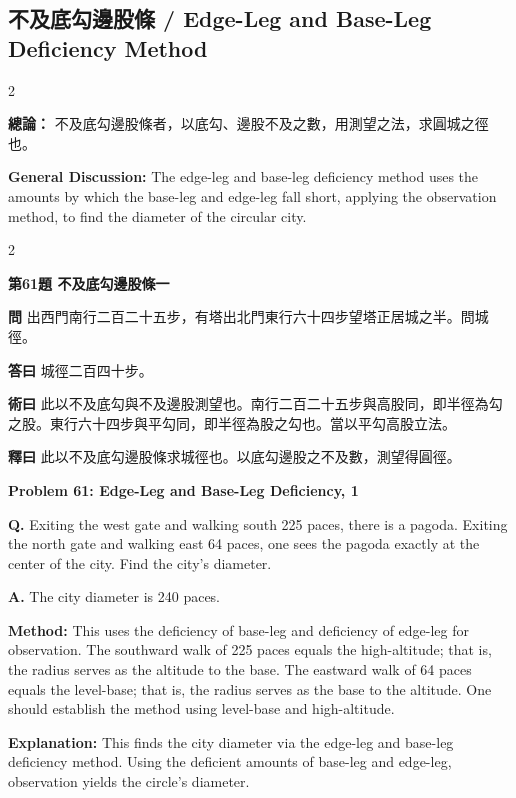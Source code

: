 \documentclass[11pt,a4paper]{article}
\newcommand{\wen}[1]{\noindent\textbf{問} #1\par\smallskip}
\newcommand{\da}[1]{\noindent\textbf{答曰} #1\par\smallskip}
\newcommand{\shu}[1]{\noindent\textbf{術曰} #1\par\smallskip}
\newcommand{\shi}[1]{\noindent\textbf{釋曰} #1\par\smallskip}
\newcommand{\wenE}[1]{\noindent\textbf{Q.} #1\par\smallskip}
\newcommand{\daE}[1]{\noindent\textbf{A.} #1\par\smallskip}
\newcommand{\shuE}[1]{\noindent\textbf{Method:} #1\par\smallskip}
\newcommand{\shiE}[1]{\noindent\textbf{Explanation:} #1\par\smallskip}
\begin{document}
\clearpage

\subsection*{不及底勾邊股條 / Edge-Leg and Base-Leg Deficiency Method}

\begin{paracol}{2}

\noindent\textbf{總論：} 不及底勾邊股條者，以底勾、邊股不及之數，用測望之法，求圓城之徑也。

\switchcolumn

\noindent\textbf{General Discussion:} The edge-leg and base-leg deficiency method uses the amounts by which the base-leg and edge-leg fall short, applying the observation method, to find the diameter of the circular city.

\end{paracol}

\bigskip

\begin{paracol}{2}

\noindent\textbf{第61題 不及底勾邊股條一}

\wen{出西門南行二百二十五步，有塔出北門東行六十四步望塔正居城之半。問城徑。}
\da{城徑二百四十步。}
\shu{此以不及底勾與不及邊股測望也。南行二百二十五步與高股同，即半徑為勾之股。東行六十四步與平勾同，即半徑為股之勾也。當以平勾高股立法。}
\shi{此以不及底勾邊股條求城徑也。以底勾邊股之不及數，測望得圓徑。}

\switchcolumn

\noindent\textbf{Problem 61: Edge-Leg and Base-Leg Deficiency, 1}

\wenE{Exiting the west gate and walking south 225 paces, there is a pagoda. Exiting the north gate and walking east 64 paces, one sees the pagoda exactly at the center of the city. Find the city's diameter.}
\daE{The city diameter is 240 paces.}
\shuE{This uses the deficiency of base-leg and deficiency of edge-leg for observation. The southward walk of 225 paces equals the high-altitude; that is, the radius serves as the altitude to the base. The eastward walk of 64 paces equals the level-base; that is, the radius serves as the base to the altitude. One should establish the method using level-base and high-altitude.}
\shiE{This finds the city diameter via the edge-leg and base-leg deficiency method. Using the deficient amounts of base-leg and edge-leg, observation yields the circle's diameter.}

\end{paracol}
\end{document}
